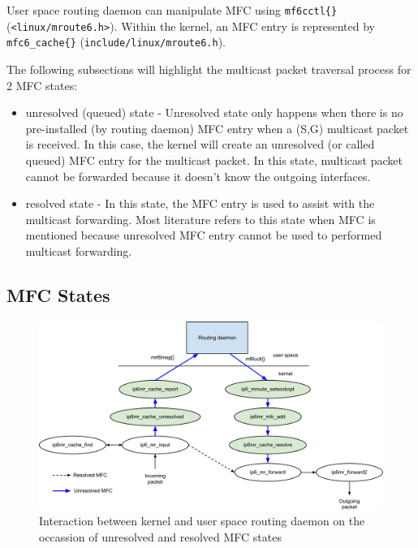 \documentclass{article}
\begin{document}
User space routing daemon can manipulate MFC using \texttt{mf6cctl\{\}}
(\texttt{<linux/mroute6.h>}). Within the kernel, an MFC entry is represented by
\texttt{mfc6\_cache\{\}} (\texttt{include/linux/mroute6.h}).

The following subsections will highlight the multicast packet traversal process
for 2 MFC states:

\begin{itemize}
  \item unresolved (queued) state - Unresolved state only happens when there is
  no pre-installed (by routing daemon) MFC entry when a (S,G) multicast packet
  is received. In this case, the kernel will create an unresolved (or called
  queued) MFC entry for the multicast packet. In this state, multicast packet
  cannot be forwarded because it doesn't know the outgoing interfaces.
  \item resolved state - In this state, the MFC entry is used to assist with the
    multicast forwarding. Most literature refers to this state when MFC is
    mentioned because unresolved MFC entry cannot be used to performed multicast
    forwarding.
\end{itemize}

 
\subsection{MFC States}
\label{sec:mfc-states}
\begin{figure}[h]
  \begin{center}
    \includegraphics[width=\textwidth]{mcast-mfc}
    \caption{Interaction between kernel and user space routing daemon on the
    occassion of unresolved and resolved MFC states}
    \label{fig:mcast-unresolved}
  \end{center}
\end{figure}
\end{document}
